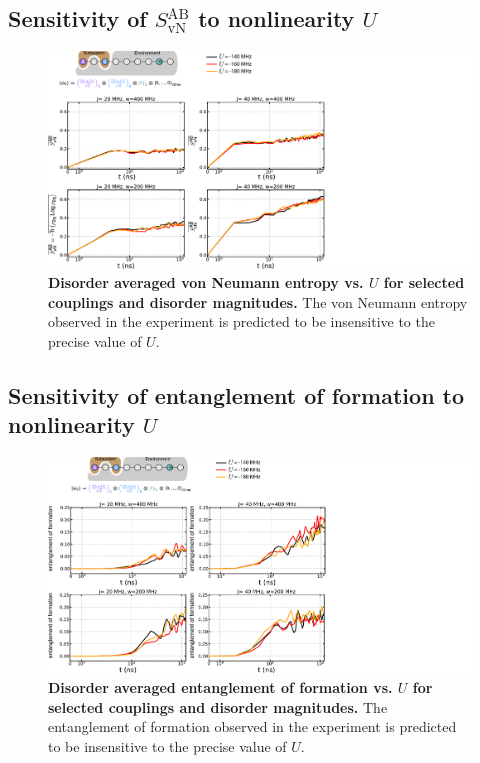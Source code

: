 \subsection{Sensitivity of $S_{\text{vN}}^{\text{AB}}$ to nonlinearity $U$}
\begin{figure}
\centering
\hspace*{20 mm}
\includegraphics[width=200mm, keepaspectratio]{./PDF/eta_svn.pdf}
\caption{\textbf{Disorder averaged von Neumann entropy vs. $U$ for selected couplings and disorder magnitudes.}  The von Neumann entropy observed in the experiment is predicted to be insensitive to the precise value of $U$.}
\end{figure}

\subsection{Sensitivity of entanglement of formation to nonlinearity $U$}
\begin{figure}[tbh]
\centering
\hspace*{20 mm}
\includegraphics[width=200mm, keepaspectratio]{./PDF/eta_eof.pdf}
\caption{
\textbf{Disorder averaged entanglement of formation vs. $U$ for selected couplings and disorder magnitudes.}
The entanglement of formation observed in the experiment is predicted to be insensitive to the precise value of $U$.}
\end{figure}

